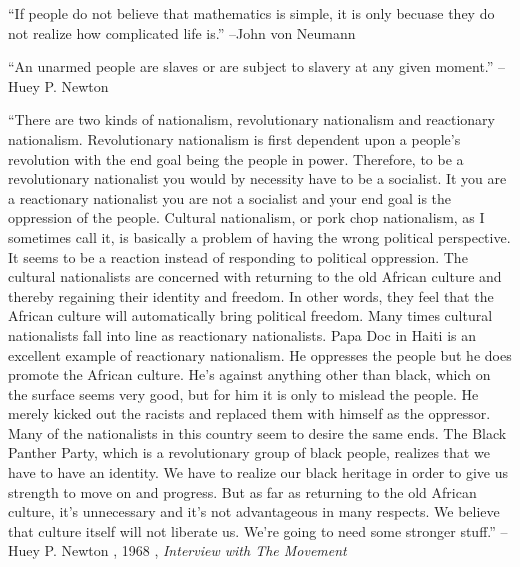 \documentclass{article}%
\begin{document}
\vspace{1mm}%
\begin{minipage}{\textwidth}%
\flushleft%
“If people do not believe that mathematics is simple, it is only becuase they do not realize how complicated life is.”%
\linebreak%
\vspace{1mm}%
–John von Neumann%
\linebreak%
\vspace{1mm}%
\end{minipage}%
\linebreak%
\vspace{1mm}%
\begin{minipage}{\textwidth}%
\flushleft%
“An unarmed people are slaves or are subject to slavery at any given moment.”%
\linebreak%
\vspace{1mm}%
–Huey P. Newton%
\linebreak%
\vspace{1mm}%
\end{minipage}%
\linebreak%
\vspace{1mm}%
\begin{minipage}{\textwidth}%
\flushleft%
“There are two kinds of nationalism, revolutionary nationalism and reactionary  nationalism. Revolutionary nationalism is first dependent upon a people’s revolution with the end goal being the people in power. Therefore, to be a revolutionary nationalist you would by necessity have to be a socialist. It you are a reactionary nationalist you are not a socialist and your end goal is the oppression of the people. Cultural nationalism, or pork chop nationalism, as I sometimes call it, is basically a problem of having the wrong political perspective. It seems to be a reaction instead of responding to political oppression. The cultural nationalists are concerned with returning to the old African culture and thereby regaining their identity and freedom. In other words, they feel that the African culture will automatically bring political freedom. Many times cultural nationalists fall into line as reactionary nationalists. Papa Doc in Haiti is an excellent example of reactionary nationalism. He oppresses the people but he does promote the African culture. He’s against anything other than black, which on the surface seems very good, but for him it is only to mislead the people. He merely kicked out the racists and replaced them with himself as the oppressor. Many of the nationalists in this country seem to desire the same ends. The Black Panther Party, which is a revolutionary group of black people, realizes that we have to have an identity. We have to realize our black heritage in order to give us strength to move on and progress. But as far as returning to the old African culture, it’s unnecessary and it’s not advantageous in many respects. We believe that culture itself will not liberate us. We’re going to need some stronger stuff.”%
\linebreak%
\vspace{1mm}%
–Huey P. Newton%
, 1968%
, \textit{Interview with The Movement}%
\linebreak%
\vspace{1mm}%
\end{minipage}%
\end{document}
